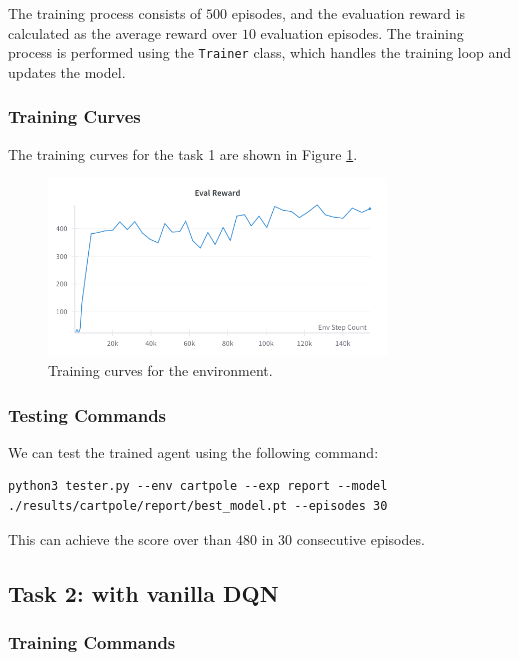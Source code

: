 The training process consists of $500$ episodes, and the evaluation reward is calculated as the average reward over $10$ evaluation episodes.
The training process is performed using the \texttt{Trainer} class, which handles the training loop and updates the model.

\subsubsection{Training Curves}

The training curves for the task 1 are shown in Figure \ref{fig:cartpole-training-curve}.

\begin{figure}[H]
    \centering
    \includegraphics[width=0.8\textwidth]{figures/task1.png}
    \caption{Training curves for the \cartpole environment.}
    \label{fig:cartpole-training-curve}
\end{figure}

\subsubsection{Testing Commands}

We can test the trained agent using the following command:
\begin{verbatim}
python3 tester.py --env cartpole --exp report --model ./results/cartpole/report/best_model.pt --episodes 30
\end{verbatim}

This can achieve the score over than $480$ in 30 consecutive episodes.

\subsection{Task 2: \pong with vanilla DQN}

\subsubsection{Training Commands}

